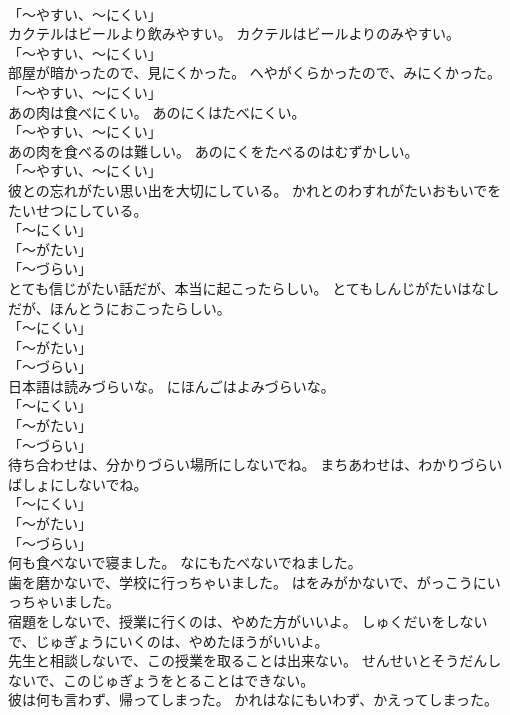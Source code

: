 \documentclass[8pt]{extreport}
\begin{document}
\begin{CJK}{UTF8}{min}
\\	「～やすい、～にくい」 
\\	カクテルはビールより飲みやすい。	カクテルはビールよりのみやすい。	
\\	「～やすい、～にくい」 
\\	部屋が暗かったので、見にくかった。	へやがくらかったので、みにくかった。	
\\	「～やすい、～にくい」 
\\	あの肉は食べにくい。	あのにくはたべにくい。	
\\	「～やすい、～にくい」 
\\	あの肉を食べるのは難しい。	あのにくをたべるのはむずかしい。	
\\	「～やすい、～にくい」 
\\	彼との忘れがたい思い出を大切にしている。	かれとのわすれがたいおもいでをたいせつにしている。	
\\	「～にくい」 
\\	「～がたい」 
\\	「～づらい」	
\\	とても信じがたい話だが、本当に起こったらしい。	とてもしんじがたいはなしだが、ほんとうにおこったらしい。	
\\	「～にくい」 
\\	「～がたい」 
\\	「～づらい」	
\\	日本語は読みづらいな。	にほんごはよみづらいな。	
\\	「～にくい」 
\\	「～がたい」 
\\	「～づらい」	
\\	待ち合わせは、分かりづらい場所にしないでね。	まちあわせは、わかりづらいばしょにしないでね。	
\\	「～にくい」 
\\	「～がたい」 
\\	「～づらい」	
\\	何も食べないで寝ました。	なにもたべないでねました。	
\\	歯を磨かないで、学校に行っちゃいました。	はをみがかないで、がっこうにいっちゃいました。	
\\	宿題をしないで、授業に行くのは、やめた方がいいよ。	しゅくだいをしないで、じゅぎょうにいくのは、やめたほうがいいよ。	
\\	先生と相談しないで、この授業を取ることは出来ない。	せんせいとそうだんしないで、このじゅぎょうをとることはできない。	
\\	彼は何も言わず、帰ってしまった。	かれはなにもいわず、かえってしまった。	

\end{CJK}
\end{document}
